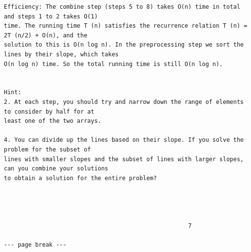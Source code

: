 \documentclass[12pt]{article}
\begin{document}
\begin{Verbatim}[breaklines=true,fontsize=\small]
Efficiency: The combine step (steps 5 to 8) takes O(n) time in total and steps 1 to 2 takes O(1)
time. The running time T (n) satisfies the recurrence relation T (n) = 2T (n/2) + O(n), and the
solution to this is O(n log n). In the preprocessing step we sort the lines by their slope, which takes
O(n log n) time. So the total running time is still O(n log n).


Hint:
2. At each step, you should try and narrow down the range of elements to consider by half for at
least one of the two arrays.

4. You can divide up the lines based on their slope. If you solve the problem for the subset of
lines with smaller slopes and the subset of lines with larger slopes, can you combine your solutions
to obtain a solution for the entire problem?




                                                     7

--- page break ---
\end{Verbatim}
\end{document}
